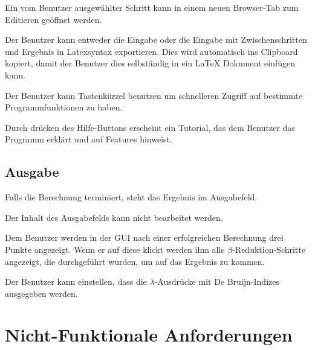 \documentclass[parskip=full,11pt,twoside]{scrartcl}
\begin{document}
Ein vom Benutzer ausgewählter Schritt kann in einem neuen Browser-Tab zum Editieren geöffnet werden.

Der Benutzer kann entweder die Eingabe oder die Eingabe mit Zwischenschritten und Ergebnis in Latexsyntax exportieren. Dies wird automatisch ins Clipboard kopiert, damit der Benutzer dies selbständig in ein LaTeX Dokument einfügen kann.

Der Benutzer kann Tastenkürzel benutzen um schnelleren Zugriff auf bestimmte Programmfunktionen zu haben.

Durch drücken des Hilfe-Buttons erscheint ein Tutorial, das dem Benutzer das Programm erklärt und auf Features hinweist.



\subsection{Ausgabe}

Falls die Berechnung terminiert, steht das Ergebnis im Ausgabefeld.

Der Inhalt des Ausgabefelds kann nicht bearbeitet werden.

Dem Benutzer werden in der GUI nach einer erfolgreichen Berechnung drei Punkte angezeigt. Wenn er auf diese klickt werden ihm alle $\beta$-Reduktion-Schritte angezeigt, die durchgeführt wurden, um auf das Ergebnis zu kommen.

Der Benutzer kann einstellen, dass die $\lambda$-Ausdrücke mit De Bruijn-Indizes ausgegeben werden.














\newpage
\section{Nicht-Funktionale Anforderungen}
\end{document}
